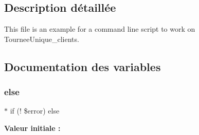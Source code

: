 \subsection{Description détaillée}
This file is an example for a command line script to work on Tournee\+Unique\+\_\+clients. 



\subsection{Documentation des variables}
\mbox{\label{tourneeunique__clients_8php_a7b6906d90f668055f3c8e8b2ae497513}} 
\subsubsection{\texorpdfstring{else}{else}}
{\footnotesize\ttfamily $\ast$ if (! \$error) else}

{\bfseries Valeur initiale \+:}
